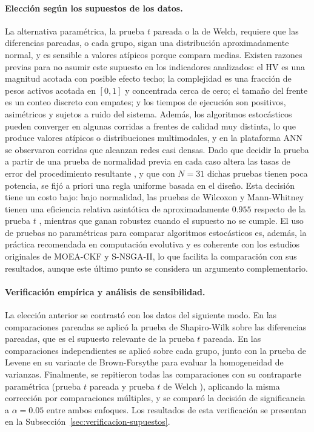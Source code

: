 \paragraph{Elección según los supuestos de los datos.} La alternativa paramétrica, la prueba $t$ pareada o la de Welch, requiere que las diferencias pareadas, o cada grupo, sigan una distribución aproximadamente normal, y es sensible a valores atípicos porque compara medias. Existen razones previas para no asumir este supuesto en los indicadores analizados: el HV es una magnitud acotada con posible efecto techo; la complejidad es una fracción de pesos activos acotada en $[0,1]$ y concentrada cerca de cero; el tamaño del frente es un conteo discreto con empates; y los tiempos de ejecución son positivos, asimétricos y sujetos a ruido del sistema. Además, los algoritmos estocásticos pueden converger en algunas corridas a frentes de calidad muy distinta, lo que produce valores atípicos o distribuciones multimodales, y en la plataforma ANN se observaron corridas que alcanzan redes casi densas. Dado que decidir la prueba a partir de una prueba de normalidad previa en cada caso altera las tasas de error del procedimiento resultante \cite{Rochon2012}, y que con $N=31$ dichas pruebas tienen poca potencia, se fijó a priori una regla uniforme basada en el diseño. Esta decisión tiene un costo bajo: bajo normalidad, las pruebas de Wilcoxon y Mann-Whitney tienen una eficiencia relativa asintótica de aproximadamente $0.955$ respecto de la prueba $t$ \cite{HodgesLehmann1956}, mientras que ganan robustez cuando el supuesto no se cumple. El uso de pruebas no paramétricas para comparar algoritmos estocásticos es, además, la práctica recomendada en computación evolutiva \cite{Derrac2011, Demsar2006, Arcuri2014, Knowles2006} y es coherente con los estudios originales de MOEA-CKF y S-NSGA-II, lo que facilita la comparación con sus resultados, aunque este último punto se considera un argumento complementario.

\paragraph{Verificación empírica y análisis de sensibilidad.} La elección anterior se contrastó con los datos del siguiente modo. En las comparaciones pareadas se aplicó la prueba de Shapiro-Wilk \cite{Shapiro1965} sobre las diferencias pareadas, que es el supuesto relevante de la prueba $t$ pareada. En las comparaciones independientes se aplicó sobre cada grupo, junto con la prueba de Levene en su variante de Brown-Forsythe \cite{BrownForsythe1974} para evaluar la homogeneidad de varianzas. Finalmente, se repitieron todas las comparaciones con su contraparte paramétrica (prueba $t$ pareada y prueba $t$ de Welch \cite{Welch1947}), aplicando la misma corrección por comparaciones múltiples, y se comparó la decisión de significancia a $\alpha=0.05$ entre ambos enfoques. Los resultados de esta verificación se presentan en la Subsección~\ref{sec:verificacion-supuestos}.

